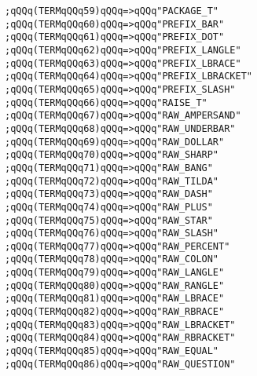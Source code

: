 \verb|;qQQq(TERMqQQq59)qQQq=>qQQq"PACKAGE_T"|\newline
\verb|;qQQq(TERMqQQq60)qQQq=>qQQq"PREFIX_BAR"|\newline
\verb|;qQQq(TERMqQQq61)qQQq=>qQQq"PREFIX_DOT"|\newline
\verb|;qQQq(TERMqQQq62)qQQq=>qQQq"PREFIX_LANGLE"|\newline
\verb|;qQQq(TERMqQQq63)qQQq=>qQQq"PREFIX_LBRACE"|\newline
\verb|;qQQq(TERMqQQq64)qQQq=>qQQq"PREFIX_LBRACKET"|\newline
\verb|;qQQq(TERMqQQq65)qQQq=>qQQq"PREFIX_SLASH"|\newline
\verb|;qQQq(TERMqQQq66)qQQq=>qQQq"RAISE_T"|\newline
\verb|;qQQq(TERMqQQq67)qQQq=>qQQq"RAW_AMPERSAND"|\newline
\verb|;qQQq(TERMqQQq68)qQQq=>qQQq"RAW_UNDERBAR"|\newline
\verb|;qQQq(TERMqQQq69)qQQq=>qQQq"RAW_DOLLAR"|\newline
\verb|;qQQq(TERMqQQq70)qQQq=>qQQq"RAW_SHARP"|\newline
\verb|;qQQq(TERMqQQq71)qQQq=>qQQq"RAW_BANG"|\newline
\verb|;qQQq(TERMqQQq72)qQQq=>qQQq"RAW_TILDA"|\newline
\verb|;qQQq(TERMqQQq73)qQQq=>qQQq"RAW_DASH"|\newline
\verb|;qQQq(TERMqQQq74)qQQq=>qQQq"RAW_PLUS"|\newline
\verb|;qQQq(TERMqQQq75)qQQq=>qQQq"RAW_STAR"|\newline
\verb|;qQQq(TERMqQQq76)qQQq=>qQQq"RAW_SLASH"|\newline
\verb|;qQQq(TERMqQQq77)qQQq=>qQQq"RAW_PERCENT"|\newline
\verb|;qQQq(TERMqQQq78)qQQq=>qQQq"RAW_COLON"|\newline
\verb|;qQQq(TERMqQQq79)qQQq=>qQQq"RAW_LANGLE"|\newline
\verb|;qQQq(TERMqQQq80)qQQq=>qQQq"RAW_RANGLE"|\newline
\verb|;qQQq(TERMqQQq81)qQQq=>qQQq"RAW_LBRACE"|\newline
\verb|;qQQq(TERMqQQq82)qQQq=>qQQq"RAW_RBRACE"|\newline
\verb|;qQQq(TERMqQQq83)qQQq=>qQQq"RAW_LBRACKET"|\newline
\verb|;qQQq(TERMqQQq84)qQQq=>qQQq"RAW_RBRACKET"|\newline
\verb|;qQQq(TERMqQQq85)qQQq=>qQQq"RAW_EQUAL"|\newline
\verb|;qQQq(TERMqQQq86)qQQq=>qQQq"RAW_QUESTION"|\newline
